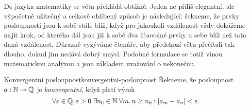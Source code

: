 Do jazyka matematiky se věta  překládá
obtížně. Jeden ne příliš elegantní, ale výpočetně užitečný a celkově oblíbený
způsob je následující: řekneme, že prvky posloupnosti jsou k sobě stále blíž,
když pro jakoukoli vzdálenost vždy dokážeme najít krok, od kterého dál jsou již
k sobě dva libovolné prvky u sebe blíž než tato daná vzdálenost. Důrazně
vyzýváme čtenáře, aby předchozí větu přečítali tak dlouho, dokud jim nedává
dobrý smysl. Podobné formulace se totiž vinou matematickou analýzou a jsou
základem uvažování o nekonečnu.

\begin{definition}{Konvergentní posloupnost}{konvergentni-posloupnost}
 Řekneme, že posloupnost $a:\mathbb{N} \to \mathbb{Q}$ je \emph{konvergentní}, když platí výrok
 \[
  \forall \varepsilon \in \mathbb{Q}, \varepsilon>0 \; \exists n_0 \in \mathbb{N} \; \forall m,n
  \geq n_0: |a_m - a_n| < \varepsilon.
 \]
\end{definition}

